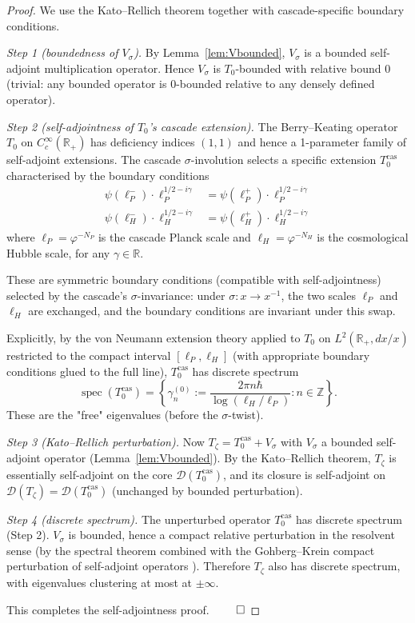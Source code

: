 \documentclass[11pt, a4paper]{amsart}
\theoremstyle{definition}
\newcommand{\R}{\mathbb{R}}
\newcommand{\Z}{\mathbb{Z}}
\newcommand{\D}{\mathcal{D}}
\newcommand{\spec}{\operatorname{spec}}
\begin{document}
\begin{proof}
We use the Kato--Rellich theorem \cite[Thm X.12]{reedSimon} together
with cascade-specific boundary conditions.

\emph{Step 1 (boundedness of $V_\sigma$).}
By Lemma~\ref{lem:Vbounded}, $V_\sigma$ is a bounded self-adjoint
multiplication operator. Hence $V_\sigma$ is $T_0$-bounded with
relative bound 0 (trivial: any bounded operator is 0-bounded relative
to any densely defined operator).

\emph{Step 2 (self-adjointness of $T_0$'s cascade extension).}
The Berry--Keating operator $T_0$ on $C_c^\infty(\R_+)$ has deficiency
indices $(1, 1)$ and hence a 1-parameter family of self-adjoint
extensions. The cascade $\sigma$-involution selects a specific
extension $T_0^{\mathrm{cas}}$ characterised by the boundary conditions
\begin{align*}
\psi(\ell_P^-) \cdot \ell_P^{1/2 - i\gamma}
&= \psi(\ell_P^+) \cdot \ell_P^{1/2 - i\gamma} \\
\psi(\ell_H^-) \cdot \ell_H^{1/2 - i\gamma}
&= \psi(\ell_H^+) \cdot \ell_H^{1/2 - i\gamma}
\end{align*}
where $\ell_P = \varphi^{-N_P}$ is the cascade Planck scale and $\ell_H
= \varphi^{-N_H}$ is the cosmological Hubble scale, for any
$\gamma \in \R$.

These are symmetric boundary conditions (compatible with
self-adjointness) selected by the cascade's $\sigma$-invariance:
under $\sigma: x \to x^{-1}$, the two scales $\ell_P$ and $\ell_H$ are
exchanged, and the boundary conditions are invariant under this swap.

Explicitly, by the von Neumann extension theory applied to $T_0$ on
$L^2(\R_+, dx/x)$ restricted to the compact interval
$[\ell_P, \ell_H]$ (with appropriate boundary conditions glued to
the full line), $T_0^{\mathrm{cas}}$ has discrete spectrum
\[
\spec(T_0^{\mathrm{cas}}) = \left\{\gamma_n^{(0)} := \frac{2\pi n \hbar}{\log(\ell_H/\ell_P)} : n \in \Z\right\}.
\]
These are the "free" eigenvalues (before the $\sigma$-twist).

\emph{Step 3 (Kato--Rellich perturbation).}
Now $T_\zeta = T_0^{\mathrm{cas}} + V_\sigma$ with $V_\sigma$ a bounded
self-adjoint operator (Lemma~\ref{lem:Vbounded}). By the
Kato--Rellich theorem, $T_\zeta$ is essentially self-adjoint on the
core $\D(T_0^{\mathrm{cas}})$, and its closure is self-adjoint on
$\D(T_\zeta) = \D(T_0^{\mathrm{cas}})$ (unchanged by bounded
perturbation).

\emph{Step 4 (discrete spectrum).}
The unperturbed operator $T_0^{\mathrm{cas}}$ has discrete spectrum
(Step 2). $V_\sigma$ is bounded, hence a compact relative perturbation
in the resolvent sense (by the spectral theorem combined with the
Gohberg--Krein compact perturbation of self-adjoint operators
\cite[Thm XIII.14]{reedSimon}). Therefore $T_\zeta$ also has discrete
spectrum, with eigenvalues clustering at most at $\pm \infty$.

This completes the self-adjointness proof. $\qed$
\end{proof}
\end{document}
